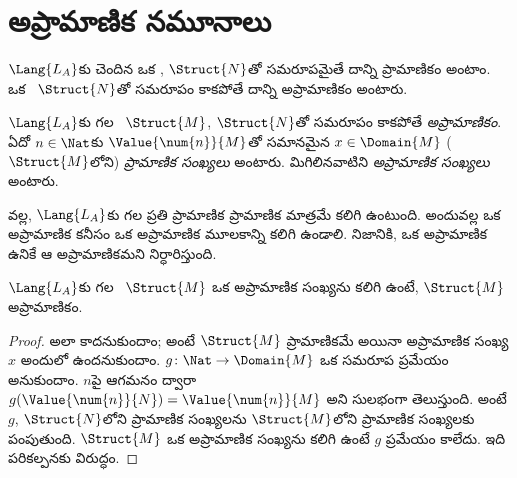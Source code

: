 \documentclass[../../../include/open-logic-section]{subfiles}
\begin{document}
\section{అప్రామాణిక నమూనాలు}

\begin{explain}
$\Lang{L_A}$కు చెందిన ఒక ,
$\Struct{N}$తో సమరూపమైతే దాన్ని ప్రామాణికం అంటాం. ఒక
~$\Struct{N}$తో సమరూపం కాకపోతే
దాన్ని అప్రామాణికం అంటారు.
\end{explain}

\begin{defn}
$\Lang{L_A}$కు గల ~$\Struct{M}$,
$\Struct{N}$తో సమరూపం కాకపోతే \emph{అప్రామాణికం}. ఏదో
$n\in\Nat$కు $\Value{\num{n}}{M}$తో సమానమైన
$x\in\Domain{M}$ 
($\Struct{M}$లోని) \emph{ప్రామాణిక సంఖ్యలు} అంటారు. మిగిలినవాటిని
\emph{అప్రామాణిక సంఖ్యలు} అంటారు.
\end{defn}

\begin{explain}
 వల్ల, $\Lang{L_A}$కు గల ప్రతి
ప్రామాణిక  ప్రామాణిక
 మాత్రమే కలిగి ఉంటుంది. అందువల్ల ఒక
అప్రామాణిక  కనీసం ఒక అప్రామాణిక
మూలకాన్ని కలిగి ఉండాలి. నిజానికి, ఒక అప్రామాణిక
 ఉనికే ఆ
 అప్రామాణికమని నిర్ధారిస్తుంది.
\end{explain}

\begin{prop}
$\Lang{L_A}$కు గల ~$\Struct{M}$
ఒక అప్రామాణిక సంఖ్యను కలిగి ఉంటే, $\Struct{M}$ అప్రామాణికం.
\end{prop}

\begin{proof}
అలా కాదనుకుందాం; అంటే $\Struct{M}$ ప్రామాణికమే అయినా అప్రామాణిక
సంఖ్య $x$ అందులో ఉందనుకుందాం. $g\colon\Nat\to\Domain{M}$ ఒక
సమరూప ప్రమేయం అనుకుందాం. $n$పై ఆగమనం ద్వారా
$g(\Value{\num{n}}{N})=\Value{\num{n}}{M}$ అని సులభంగా తెలుస్తుంది.
అంటే $g$, $\Struct{N}$లోని ప్రామాణిక సంఖ్యలను $\Struct{M}$లోని
ప్రామాణిక సంఖ్యలకు పంపుతుంది. $\Struct{M}$ ఒక అప్రామాణిక సంఖ్యను
కలిగి ఉంటే $g$  ప్రమేయం కాలేదు. ఇది
పరికల్పనకు విరుద్ధం.
\end{proof}
\end{document}
